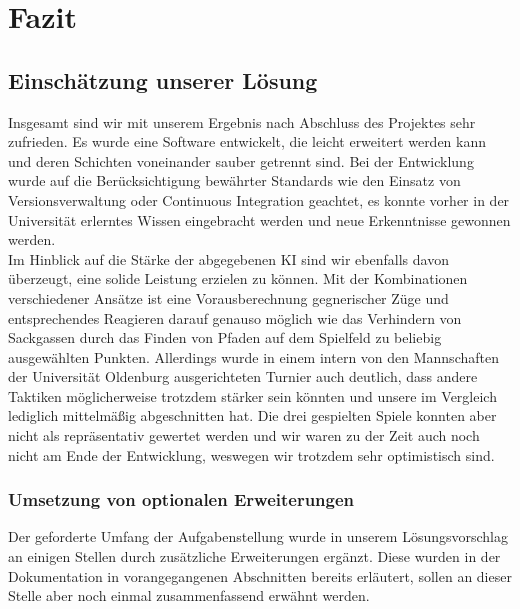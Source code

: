 \chapter{Fazit}
\label{ch:fazit}

\section{Einschätzung unserer Lösung}
\label{sec:einschaetzung}

Insgesamt sind wir mit unserem Ergebnis nach Abschluss des Projektes sehr zufrieden.
Es wurde eine Software entwickelt, die leicht erweitert werden kann und deren Schichten voneinander sauber getrennt
sind.
Bei der Entwicklung wurde auf die Berücksichtigung bewährter Standards wie den Einsatz von Versionsverwaltung oder
Continuous Integration geachtet, es konnte vorher in der Universität erlerntes Wissen eingebracht werden und neue
Erkenntnisse gewonnen werden. \\

Im Hinblick auf die Stärke der abgegebenen \ac{KI} sind wir ebenfalls davon überzeugt, eine solide Leistung erzielen zu
können.
Mit der Kombinationen verschiedener Ansätze ist eine Vorausberechnung gegnerischer Züge und entsprechendes Reagieren
darauf genauso möglich wie das Verhindern von Sackgassen durch das Finden von Pfaden auf dem Spielfeld zu beliebig
ausgewählten Punkten.
Allerdings wurde in einem intern von den Mannschaften der Universität Oldenburg ausgerichteten Turnier auch deutlich,
dass andere Taktiken möglicherweise trotzdem stärker sein könnten und unsere im Vergleich lediglich mittelmäßig
abgeschnitten hat.
Die drei gespielten Spiele konnten aber nicht als repräsentativ gewertet werden und wir waren zu der Zeit auch noch
nicht am Ende der Entwicklung, weswegen wir trotzdem sehr optimistisch sind.

\subsection{Umsetzung von optionalen Erweiterungen}
\label{subsec:optionale-erweiterungen}

Der geforderte Umfang der Aufgabenstellung  wurde in unserem Lösungsvorschlag an einigen
Stellen durch zusätzliche Erweiterungen ergänzt.
Diese wurden in der Dokumentation in vorangegangenen Abschnitten bereits erläutert, sollen an dieser Stelle aber noch
einmal zusammenfassend erwähnt werden. \\

